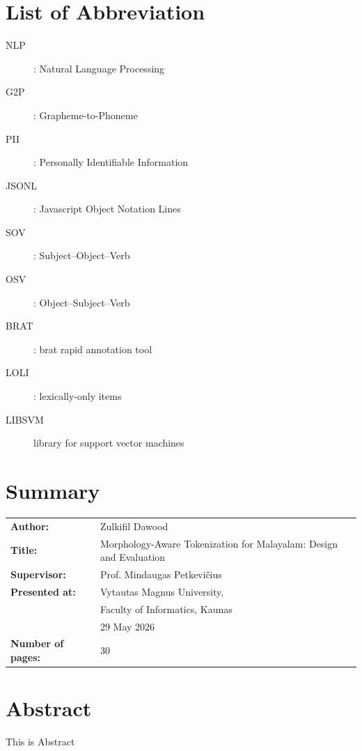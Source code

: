 \documentclass[12pt]{article}
\begin{document}
\newpage
\onecolumn
\tableofcontents
\newpage
\section*{List of Abbreviation}
\begin{description}
  \item[NLP] : Natural Language Processing 
  \item[G2P]: Grapheme-to-Phoneme
  \item[PII]: Personally Identifiable Information
  \item[JSONL]: Javascript Object Notation Lines 
  \item[SOV]: Subject–Object–Verb
  \item[OSV]: Object–Subject–Verb 
  \item[BRAT]: brat rapid annotation tool 
  \item[LOLI]: lexically-only items
  \item[LIBSVM] library for support vector machines
\end{description}
\newpage


\section*{Summary}
\renewcommand\arraystretch{1.3} %
\noindent
\begin{tabular}{@{} >{\bfseries}p{4cm} p{\dimexpr\textwidth-4cm}@{}}
Author:          & Zulkifil Dawood          \\ 
Title:           &  Morphology-Aware Tokenization for Malayalam: Design and Evaluation\\ 
Supervisor:      & Prof. Mindaugas Petkevičius           \\ 
Presented at:    & Vytautas Magnus University,    \\
                 & Faculty of Informatics, Kaunas \\ 
                 & 29 May 2026                         \\ 
Number of pages: & 30                             \\ 
\end{tabular}
\newpage

\setcounter{page}{1}

\section*{Abstract}
This is Abstract 
\end{document}
